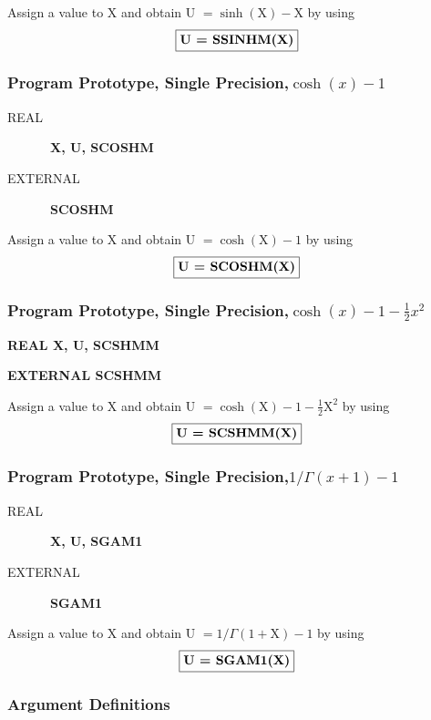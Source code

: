 \documentclass[twoside]{MATH77}
\begin{document}
Assign a value to X and obtain U $= \sinh(\text{X}) - \text{X}$ by using
$$
\fbox{\bf U = SSINHM(X)}
$$
\subsubsection{Program Prototype, Single Precision,\newline  $\cosh(x) - 1$}

\begin{description}

\item[REAL] \ {\bf  X, U, SCOSHM}

\item[EXTERNAL] \ {\bf  SCOSHM}

\end{description}

Assign a value to X and obtain U $= \cosh(\text{X}) - 1$ by using
$$
\fbox{\bf U = SCOSHM(X)}
$$
\subsubsection{Program Prototype, Single Precision,\newline  $\cosh(x) -
 1 - \frac 12 x^2$}

{\bf REAL X, U, SCSHMM}

{\bf EXTERNAL SCSHMM}

Assign a value to X and obtain U $= \cosh(\text{X}) - 1 - \frac{1}{2} \text{X}^2$ by using
$$
\fbox{\bf U = SCSHMM(X)}
$$
\subsubsection{Program Prototype, Single Precision,\newline  $1/\Gamma (x+1) - 1$}

\begin{description}

\item[REAL] \ {\bf  X, U, SGAM1}

\item[EXTERNAL] \ {\bf  SGAM1}

\end{description}

Assign a value to X and obtain U $= 1/\Gamma (1+\text{X}) - 1$ by
using
$$
\fbox{\bf U = SGAM1(X)}
$$
\subsubsection{Argument Definitions}
\end{document}

